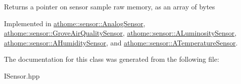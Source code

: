 Returns a pointer on sensor sample raw memory, as an array of bytes 

Implemented in \mbox{\hyperlink{classathome_1_1sensor_1_1_analog_sensor_ac45070688a9433256a5f847467c251fa}{athome\+::sensor\+::\+Analog\+Sensor}}, \mbox{\hyperlink{classathome_1_1sensor_1_1_grove_air_quality_sensor_aee12d8cf6439b752c868f75cae298182}{athome\+::sensor\+::\+Grove\+Air\+Quality\+Sensor}}, \mbox{\hyperlink{classathome_1_1sensor_1_1_a_luminosity_sensor_a299491729362d34f474094dfd10eb310}{athome\+::sensor\+::\+A\+Luminosity\+Sensor}}, \mbox{\hyperlink{classathome_1_1sensor_1_1_a_humidity_sensor_a2eb6de3ce2a4aeae0d9e556389d2b329}{athome\+::sensor\+::\+A\+Humidity\+Sensor}}, and \mbox{\hyperlink{classathome_1_1sensor_1_1_a_temperature_sensor_a397794217f3163950add6d28f69a6202}{athome\+::sensor\+::\+A\+Temperature\+Sensor}}.



The documentation for this class was generated from the following file\+:\begin{DoxyCompactItemize}
\item 
I\+Sensor.\+hpp\end{DoxyCompactItemize}
